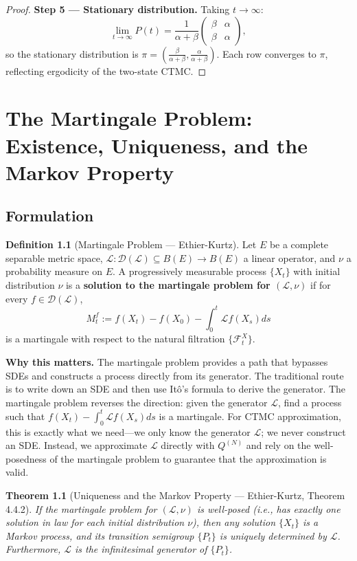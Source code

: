 \documentclass[11pt,a4paper,openany]{book}
\theoremstyle{definition}
\newtheorem{definition}{Definition}[chapter]
\theoremstyle{plain}
\newtheorem{theorem}{Theorem}[chapter]
\theoremstyle{remark}
\newcommand{\1}{\mathbbm{1}}
\newcommand{\F}{\mathcal{F}}
\newcommand{\calL}{\mathcal{L}}
\newcommand{\calD}{\mathcal{D}}
\begin{document}
\begin{proof}
\textbf{Step 5 --- Stationary distribution.} Taking $t \to \infty$:
\[
\lim_{t \to \infty} P(t) = \frac{1}{\alpha+\beta} \begin{pmatrix} \beta & \alpha \\ \beta & \alpha \end{pmatrix},
\]
so the stationary distribution is $\pi = (\frac{\beta}{\alpha+\beta}, \frac{\alpha}{\alpha+\beta})$. Each row converges to $\pi$, reflecting ergodicity of the two-state CTMC.
\end{proof}

\chapter{The Martingale Problem: Existence, Uniqueness, and the Markov Property}

\section{Formulation}

\begin{definition}[Martingale Problem --- Ethier-Kurtz]
Let $E$ be a complete separable metric space, $\calL: \calD(\calL) \subseteq B(E) \to B(E)$ a linear operator, and $\nu$ a probability measure on $E$. A progressively measurable process $\{X_{t}\}$ with initial distribution $\nu$ is a \textbf{solution to the martingale problem for $(\calL, \nu)$} if for every $f \in \calD(\calL)$,
\[
M_{t}^{f} := f(X_{t}) - f(X_{0}) - \int_{0}^{t} \calL f(X_{s}) ds
\]
is a martingale with respect to the natural filtration $\{\F_{t}^{X}\}$.
\end{definition}

\medskip
\noindent\textbf{Why this matters.} The martingale problem provides a path that bypasses SDEs and constructs a process directly from its generator. The traditional route is to write down an SDE and then use It\^{o}'s formula to derive the generator. The martingale problem reverses the direction: given the generator $\mathcal{L}$, find a process such that $f(X_t) - \int_0^t \mathcal{L}f(X_s)ds$ is a martingale. For CTMC approximation, this is exactly what we need---we only know the generator $\mathcal{L}$; we never construct an SDE. Instead, we approximate $\mathcal{L}$ directly with $Q^{(N)}$ and rely on the well-posedness of the martingale problem to guarantee that the approximation is valid.

\begin{theorem}[Uniqueness and the Markov Property --- Ethier-Kurtz, Theorem 4.4.2]
If the martingale problem for $(\calL, \nu)$ is well-posed (i.e., has exactly one solution in law for each initial distribution $\nu$), then any solution $\{X_{t}\}$ is a Markov process, and its transition semigroup $\{P_{t}\}$ is uniquely determined by $\calL$. Furthermore, $\calL$ is the infinitesimal generator of $\{P_{t}\}$.
\end{theorem}
\end{document}
